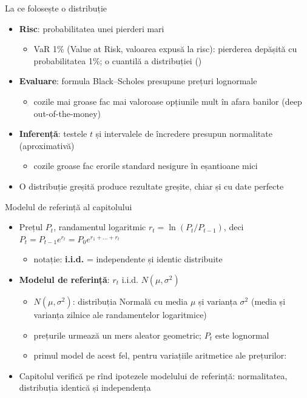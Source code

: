 \begin{frame}{La ce folosește o distribuție}
\itemsize{\small}
\begin{itemize}
    \item \textbf{Risc}: probabilitatea unei pierderi mari
    \begin{itemize}
        \item VaR 1\% (Value at Risk, valoarea expusă la risc): pierderea depășită cu probabilitatea 1\%; o cuantilă a distribuției ()
    \end{itemize}
    \item \textbf{Evaluare}: formula Black--Scholes presupune prețuri lognormale
    \begin{itemize}
        \item cozile mai groase fac mai valoroase opțiunile mult în afara banilor (deep out-of-the-money)
    \end{itemize}
    \item \textbf{Inferență}: testele $t$ și intervalele de încredere presupun normalitate (aproximativă)
    \begin{itemize}
        \item cozile groase fac erorile standard nesigure în eșantioane mici
    \end{itemize}
    \item O distribuție greșită produce rezultate greșite, chiar și cu date perfecte
\end{itemize}
\end{frame}

\begin{frame}{Modelul de referință al capitolului}
\itemsize{\small}
\begin{itemize}
    \item Prețul $P_t$, randamentul logaritmic $r_t = \ln(P_t/P_{t-1})$, deci $P_t = P_{t-1}e^{r_t} = P_0 e^{r_1 + \dots + r_t}$
    \begin{itemize}
        \item notație: \textbf{i.i.d.} = independente și identic distribuite
    \end{itemize}
    \item \textbf{Modelul de referință}: $r_t$ i.i.d. $N(\mu, \sigma^2)$
    \begin{itemize}
        \item $N(\mu, \sigma^2)$: distribuția Normală cu media $\mu$ și varianța $\sigma^2$ (media și varianța zilnice ale randamentelor logaritmice)
        \item prețurile urmează un mers aleator geometric; $P_t$ este lognormal 
        \item primul model de acest fel, pentru variațiile aritmetice ale prețurilor: 
    \end{itemize}
    \item Capitolul verifică pe rînd ipotezele modelului de referință: normalitatea, distribuția identică și independența
\end{itemize}
\end{frame}


